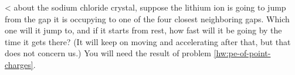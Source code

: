 <%
about the sodium chloride crystal, suppose the lithium ion
is going to jump from the gap it is occupying to one of the
four closest neighboring gaps.  Which one will it jump to,
and if it starts from rest, how fast will it be going by the
time it gets there?  (It will keep on moving and accelerating
after that, but that does not concern us.) 
You will need the result of problem \ref{hw:pe-of-point-charges}.\answercheck

